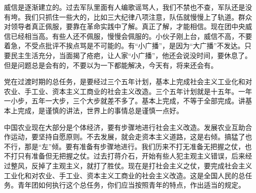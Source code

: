 威信是逐渐建立的。过去军队里面有人编歌谣骂人，我们不禁也不查，军队还是没有垮。我们只抓住一些大的，比如三大纪律八项注意，队伍就慢慢上了轨道。群众对领导者真正佩服，要靠在革命实践中了解。真正了解，才能相信。现在团中央威信已经相当高。有些人还不佩服，慢慢会佩服的。小伙子刚上台，威信不高，不要着急，不受点批评不挨点骂是不可能的。有“小广播”，是因为“大广播”不发达。只要民主生活充分，当面揭了疮疤，让人家“小广播”，他还会说没时间，要休息了。但是问题总是会有的，不要以为一下都能解决，今天有，将来还会有。

党在过渡时期的总任务，是要经过三个五年计划，基本上完成社会主义工业化和对农业、手工业、资本主义工商业的社会主义改造。三个五年计划就是十五年。一年一小步，五年一大步，三个大步就差不多了。基本上完成，不等于全部完成。讲基本上完成，是谨慎的讲法，世界上的事情总是谨慎一点好。

中国农业现在大部分是个体经济，要有步骤地进行社会主义改造。发展农业互助合作运动，要坚持自愿原则。不去发展，就会走资本主义道路，这是右倾。搞猛了也不行，那是“左”倾。要有准备有步骤地进行。我们历来不打无准备无把握之仗，也不打只有准备但无把握之仗。过去打蒋介石，开始有些人犯主观主义错误，后来经过整风，反掉了主观主义，就打了胜仗。现在是打社会主义之仗，要完成社会主义工业化和对农业、手工业、资本主义工商业的社会主义改造。这是全国人民的总任务。青年团如何执行这个总任务，你们应当按照青年的特点，作出适当的规定。
